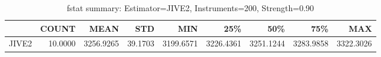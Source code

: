 \begin{table}[ht]
\centering
\caption{fstat summary: Estimator=JIVE2, Instruments=200, Strength=0.90}
\begin{tabular}{lrrrrrrrr}
\toprule
 & COUNT & MEAN & STD & MIN & 25\% & 50\% & 75\% & MAX \\
\midrule
JIVE2 & 10.0000 & 3256.9265 & 39.1703 & 3199.6571 & 3226.4361 & 3251.1244 & 3283.9858 & 3322.3026 \\
\bottomrule
\end{tabular}
\end{table}
